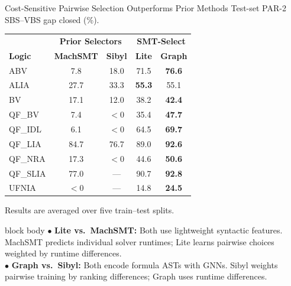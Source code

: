 \documentclass[aspectratio=169,11pt]{beamer}
\begin{document}
\begin{frame}{Cost-Sensitive Pairwise Selection Outperforms Prior Methods}
  \centering
  \scriptsize
  Test-set PAR-2 SBS--VBS gap closed (\%).

  \vspace{0.45em}
  \renewcommand{\arraystretch}{1.18}
  \begin{tabular}{l cc cc}
    & \multicolumn{2}{c}{\textbf{Prior Selectors}}
    & \multicolumn{2}{c}{\textbf{SMT-Select}}\\
    \textbf{Logic} & \textbf{MachSMT} & \textbf{Sibyl}
      & \textbf{Lite} & \textbf{Graph}\\ \hline
    ABV      & 7.8  & 18.0 & 71.5 & \textbf{\textcolor{winnerblue}{76.6}}\\
    ALIA     & 27.7 & 33.3 & \textbf{\textcolor{winnerblue}{55.3}} & 55.1\\
    BV       & 17.1 & 12.0 & 38.2 & \textbf{\textcolor{winnerblue}{42.4}}\\
    QF\_BV   & 7.4  & \(<0\) & 35.4 & \textbf{\textcolor{winnerblue}{47.7}}\\
    QF\_IDL  & 6.1  & \(<0\) & 64.5 & \textbf{\textcolor{winnerblue}{69.7}}\\
    QF\_LIA  & 84.7 & 76.7 & 89.0 & \textbf{\textcolor{winnerblue}{92.6}}\\
    QF\_NRA  & 17.3 & \(<0\) & 44.6 & \textbf{\textcolor{winnerblue}{50.6}}\\
    QF\_SLIA & 77.0 & --- & 90.7 & \textbf{\textcolor{winnerblue}{92.8}}\\
    UFNIA    & \(<0\) & --- & 14.8 & \textbf{\textcolor{winnerblue}{24.5}}
  \end{tabular}

  \vspace{0.3em}
  \tiny
  Results are averaged over five train--test splits.

  \vfill
  \begin{beamercolorbox}[rounded=true,sep=0.45em]{block body}
    \scriptsize
    \(\bullet\)\enspace
    \textbf{Lite vs.\ MachSMT:} Both use lightweight syntactic features.
    MachSMT predicts individual solver runtimes; Lite learns pairwise
    choices weighted by runtime differences.\\[0.25em]
    \(\bullet\)\enspace
    \textbf{Graph vs.\ Sibyl:} Both encode formula ASTs with GNNs.
    Sibyl weights pairwise training by ranking differences; Graph uses
    runtime differences.
  \end{beamercolorbox}
\end{frame}
\end{document}
